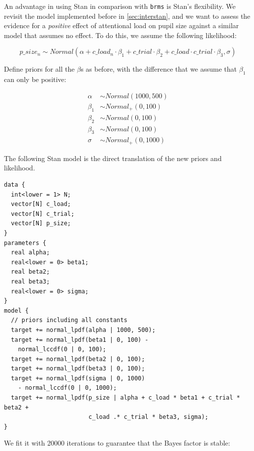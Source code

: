 \documentclass[12pt,]{krantz}
\theoremstyle{definition}
\theoremstyle{definition}
\theoremstyle{definition}
\theoremstyle{remark}
\begin{document}
An advantage in using Stan in comparison with \texttt{brms} is Stan's
flexibility. We revisit the model implemented before in
\ref{sec:interstan}, and we want to assess the evidence for a
\emph{positive} effect of attentional load on pupil size against a
similar model that assumes no effect. To do this, we assume the
following likelihood:

\begin{equation}
p\_size_n \sim Normal(\alpha + c\_load_n \cdot \beta_1 + c\_trial \cdot \beta_2 + c\_load \cdot c\_trial \cdot \beta_3, \sigma)
\end{equation}

Define priors for all the \(\beta\)s as before, with the difference that
we assume that \(\beta_1\) can only be positive:

\begin{equation}
\begin{aligned}
\alpha &\sim Normal(1000, 500) \\
\beta_1 &\sim Normal_+(0, 100) \\
\beta_2 &\sim Normal(0, 100) \\
\beta_3 &\sim Normal(0, 100) \\
\sigma &\sim Normal_+(0, 1000)
\end{aligned}
\end{equation}

The following Stan model is the direct translation of the new priors and
likelihood.

\begin{verbatim}
data {
  int<lower = 1> N;
  vector[N] c_load;
  vector[N] c_trial;
  vector[N] p_size;
}
parameters {
  real alpha;
  real<lower = 0> beta1;
  real beta2;
  real beta3;
  real<lower = 0> sigma;
}
model {
  // priors including all constants
  target += normal_lpdf(alpha | 1000, 500);
  target += normal_lpdf(beta1 | 0, 100) -
    normal_lccdf(0 | 0, 100);
  target += normal_lpdf(beta2 | 0, 100);
  target += normal_lpdf(beta3 | 0, 100);
  target += normal_lpdf(sigma | 0, 1000)
    - normal_lccdf(0 | 0, 1000);
  target += normal_lpdf(p_size | alpha + c_load * beta1 + c_trial * beta2 +
                        c_load .* c_trial * beta3, sigma);
}
\end{verbatim}

We fit it with 20000 iterations to guarantee that the Bayes factor is
stable:
\end{document}
